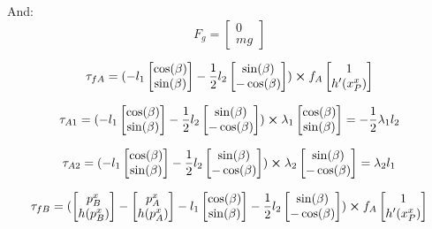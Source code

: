 \documentclass[10pt]{article}
\begin{document}
And:
\[
F_g = 
\begin{bmatrix}
0 \\
mg
\end{bmatrix}
\]

\[
\tau_{fA} = 
(
-
l_1
\begin{bmatrix}
\cos(\beta) \\
\sin(\beta)
\end{bmatrix}
-
\frac{1}{2} l_2
\begin{bmatrix}
\sin(\beta) \\
-\cos(\beta)
\end{bmatrix}
) 
\cross
f_A
\begin{bmatrix}
  1 \\
  h'(x_P^x)
\end{bmatrix}
\]

\[
\tau_{A1} = 
(
-
l_1
\begin{bmatrix}
\cos(\beta) \\
\sin(\beta)
\end{bmatrix}
-
\frac{1}{2} l_2
\begin{bmatrix}
\sin(\beta) \\
-\cos(\beta)
\end{bmatrix}
) 
\cross
\lambda_1
\begin{bmatrix}
  \cos(\beta) \\
  \sin(\beta)
\end{bmatrix}
=
-\frac{1}{2}\lambda_1 l_2
\]

\[
\tau_{A2} = 
(
-
l_1
\begin{bmatrix}
\cos(\beta) \\
\sin(\beta)
\end{bmatrix}
-
\frac{1}{2} l_2
\begin{bmatrix}
\sin(\beta) \\
-\cos(\beta)
\end{bmatrix}
) 
\cross
\lambda_2
\begin{bmatrix}
  \sin(\beta) \\
  - \cos(\beta)
\end{bmatrix}
=
\lambda_2l_1 
\]

\[
\tau_{fB} = 
(
\begin{bmatrix}
p_B^x \\
h(p_B^x)
\end{bmatrix}
-
\begin{bmatrix}
p_A^x \\
h(p_A^x)
\end{bmatrix}
-
l_1
\begin{bmatrix}
\cos(\beta) \\
\sin(\beta)
\end{bmatrix}
-
\frac{1}{2} l_2
\begin{bmatrix}
\sin(\beta) \\
-\cos(\beta)
\end{bmatrix}
) 
\cross
f_A
\begin{bmatrix}
  1 \\
  h'(x_P^x)
\end{bmatrix}
\]
\end{document}
